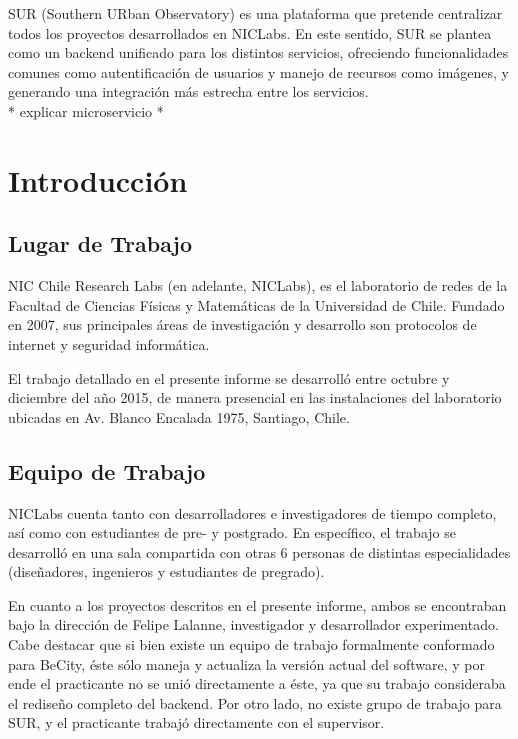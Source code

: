 \documentclass[11pt,letterpaper]{article}
\begin{document}
SUR (Southern URban Observatory) es una plataforma que pretende centralizar todos los proyectos desarrollados en NICLabs. En este sentido, SUR se plantea como un backend unificado para los distintos servicios, ofreciendo funcionalidades comunes como autentificación de usuarios y manejo de recursos como imágenes, y generando una integración más estrecha entre los servicios.\\

* explicar microservicio *
\newpage
\section{Introducción}
\subsection{Lugar de Trabajo}

NIC Chile Research Labs (en adelante, NICLabs)\cite{niclabs}, es el laboratorio de redes de la Facultad de Ciencias Físicas y Matemáticas de la Universidad de Chile. Fundado en 2007, sus principales áreas de investigación y desarrollo son protocolos de internet y seguridad informática.

El trabajo detallado en el presente informe se desarrolló entre octubre y diciembre del año 2015, de manera presencial en las instalaciones del laboratorio ubicadas en Av. Blanco Encalada 1975, Santiago, Chile.

\subsection{Equipo de Trabajo}


NICLabs cuenta tanto con desarrolladores e investigadores de tiempo completo, así como con estudiantes de pre- y postgrado. En específico, el trabajo se desarrolló en una sala compartida con otras 6 personas de distintas especialidades (diseñadores, ingenieros y estudiantes de pregrado).

En cuanto a los proyectos descritos en el presente informe, ambos se encontraban bajo la dirección de Felipe Lalanne\cite{lalanne}, investigador y desarrollador experimentado. Cabe destacar que si bien existe un equipo de trabajo formalmente conformado para BeCity, éste sólo maneja y actualiza la versión actual del software, y por ende el practicante no se unió directamente a éste, ya que su trabajo consideraba el rediseño completo del backend.
Por otro lado, no existe grupo de trabajo para SUR, y el practicante trabajó directamente con el supervisor.
\end{document}
